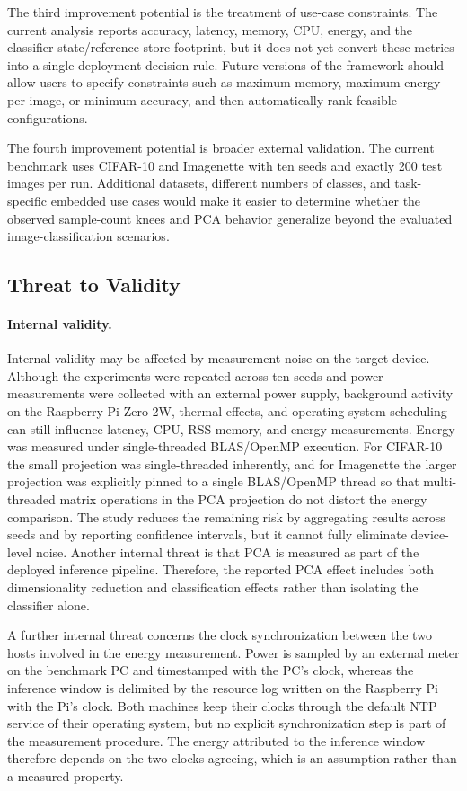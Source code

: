\documentclass[sigconf,review,nonacm]{acmart}
\begin{document}
The third improvement potential is the treatment of use-case constraints.
The current analysis reports accuracy, latency, memory, CPU, energy, and the classifier state/reference-store footprint, but it does not yet convert these metrics into a single deployment decision rule.
Future versions of the framework should allow users to specify constraints such as maximum memory, maximum energy per image, or minimum accuracy, and then automatically rank feasible configurations.

The fourth improvement potential is broader external validation.
The current benchmark uses CIFAR-10 and Imagenette with ten seeds and exactly 200 test images per run.
Additional datasets, different numbers of classes, and task-specific embedded use cases would make it easier to determine whether the observed sample-count knees and PCA behavior generalize beyond the evaluated image-classification scenarios.

\subsection{Threat to Validity}
\label{sec:threats}
\paragraph{Internal validity.}
Internal validity may be affected by measurement noise on the target device.
Although the experiments were repeated across ten seeds and power measurements were collected with an external power supply, background activity on the Raspberry Pi Zero 2W, thermal effects, and operating-system scheduling can still influence latency, CPU, RSS memory, and energy measurements.
Energy was measured under single-threaded BLAS/OpenMP execution. For CIFAR-10 the small projection was single-threaded inherently, and for Imagenette the larger projection was explicitly pinned to a single BLAS/OpenMP thread so that multi-threaded matrix operations in the PCA projection do not distort the energy comparison.
The study reduces the remaining risk by aggregating results across seeds and by reporting confidence intervals, but it cannot fully eliminate device-level noise.
Another internal threat is that PCA is measured as part of the deployed inference pipeline. Therefore, the reported PCA effect includes both dimensionality reduction and classification effects rather than isolating the classifier alone.

A further internal threat concerns the clock synchronization between the two hosts involved in the energy measurement. Power is sampled by an external meter on the benchmark PC and timestamped with the PC's clock, whereas the inference window is delimited by the resource log written on the Raspberry Pi with the Pi's clock. Both machines keep their clocks through the default NTP service of their operating system, but no explicit synchronization step is part of the measurement procedure. The energy attributed to the inference window therefore depends on the two clocks agreeing, which is an assumption rather than a measured property.
\end{document}
